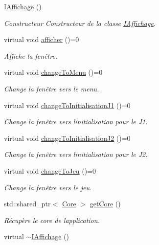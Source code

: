 \begin{DoxyCompactItemize}
\item 
\hyperlink{class_i_affichage_a0bc54bcf0afae03db411636834b372fe}{I\+Affichage} ()\hypertarget{class_i_affichage_a0bc54bcf0afae03db411636834b372fe}{}\label{class_i_affichage_a0bc54bcf0afae03db411636834b372fe}

\begin{DoxyCompactList}\small\item\em Constructeur Constructeur de la classe \hyperlink{class_i_affichage}{I\+Affichage}. \end{DoxyCompactList}\item 
virtual void \hyperlink{class_i_affichage_a87e168995340186305675343d4b769fe}{afficher} ()=0
\begin{DoxyCompactList}\small\item\em Affiche la fenêtre. \end{DoxyCompactList}\item 
virtual void \hyperlink{class_i_affichage_a147a42f3068b7dc51d5a196252e53a39}{change\+To\+Menu} ()=0
\begin{DoxyCompactList}\small\item\em Change la fenêtre vers le menu. \end{DoxyCompactList}\item 
virtual void \hyperlink{class_i_affichage_ac03c56ab489b760b1e42af15ac421039}{change\+To\+Initialisation\+J1} ()=0
\begin{DoxyCompactList}\small\item\em Change la fenêtre vers l\textquotesingle{}initialisation pour le J1. \end{DoxyCompactList}\item 
virtual void \hyperlink{class_i_affichage_a425bcafe36ba332f2cbc4badc99e19c2}{change\+To\+Initialisation\+J2} ()=0
\begin{DoxyCompactList}\small\item\em Change la fenêtre vers l\textquotesingle{}initialisation pour le J2. \end{DoxyCompactList}\item 
virtual void \hyperlink{class_i_affichage_a52e20907ed94e272c592429d95fa5165}{change\+To\+Jeu} ()=0
\begin{DoxyCompactList}\small\item\em Change la fenêtre vers le jeu. \end{DoxyCompactList}\item 
std\+::shared\+\_\+ptr$<$ \hyperlink{class_core}{Core} $>$ \hyperlink{class_i_affichage_a7245173f805ffb6a17b4fbda887bcfd6}{get\+Core} ()
\begin{DoxyCompactList}\small\item\em Récupère le core de l\textquotesingle{}application. \end{DoxyCompactList}\item 
virtual \hyperlink{class_i_affichage_a2b22d88915d1a8951ba3cd027bbaed0f}{$\sim$\+I\+Affichage} ()\hypertarget{class_i_affichage_a2b22d88915d1a8951ba3cd027bbaed0f}{}\label{class_i_affichage_a2b22d88915d1a8951ba3cd027bbaed0f}


\end{DoxyCompactItemize}
